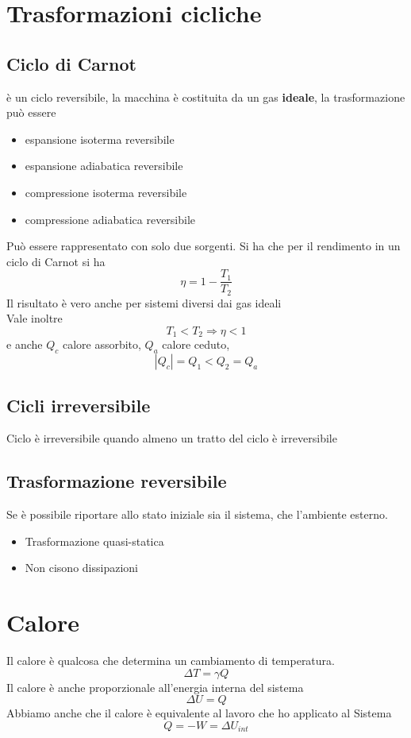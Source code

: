 \documentclass[a4paper]{report}
\begin{document}
  \section{Trasformazioni cicliche}
  \subsection{Ciclo di Carnot}
  è un ciclo reversibile, la macchina è costituita da un gas \textbf{ideale}, la trasformazione può essere
  \begin{itemize}
    \item espansione isoterma reversibile
    \item espansione adiabatica reversibile
    \item compressione isoterma reversibile
    \item compressione adiabatica reversibile
  \end{itemize}
  Può essere rappresentato con solo due sorgenti. Si ha che per il rendimento in un ciclo di Carnot si ha
  $$ \eta = 1 - \frac{T_1}{T_2}$$
  Il risultato è vero anche per sistemi diversi dai gas ideali \\
  Vale inoltre
  $$ T_1 < T_2 \Rightarrow \eta < 1 $$
  e anche $Q_c$ calore assorbito, $Q_a$ calore ceduto,
  $$ |Q_c| = Q_1 < Q_2 = Q_a $$

  \subsection{Cicli irreversibile}
  Ciclo è irreversibile quando almeno un tratto del ciclo è irreversibile

  \subsection{Trasformazione reversibile}
  Se è possibile riportare allo stato iniziale sia il sistema, che l'ambiente esterno.
  \begin{itemize}
    \item Trasformazione quasi-statica
    \item Non cisono dissipazioni
  \end{itemize}

  \section{Calore}
  Il calore è qualcosa che determina un cambiamento di temperatura.
  $$ \Delta T = \gamma Q$$
  Il calore è anche proporzionale all'energia interna del sistema
  $$ \Delta U = Q$$
  Abbiamo anche che il calore è equivalente al lavoro che ho applicato al Sistema
  $$Q = -W = \Delta U_{int}$$
\end{document}
